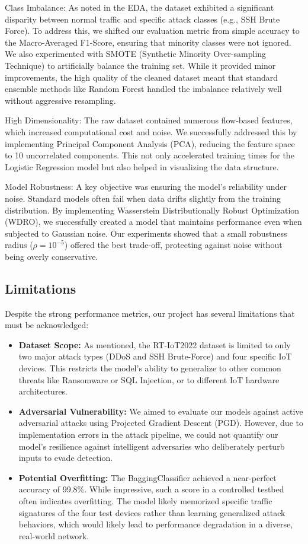 \documentclass[12pt, a4paper]{article}
\begin{document}
Class Imbalance: As noted in the EDA, the dataset exhibited a significant disparity between normal traffic and specific attack classes (e.g., SSH Brute Force). To address this, we shifted our evaluation metric from simple accuracy to the Macro-Averaged F1-Score, ensuring that minority classes were not ignored. We also experimented with SMOTE (Synthetic Minority Over-sampling Technique) to artificially balance the training set. While it provided minor improvements, the high quality of the cleaned dataset meant that standard ensemble methods like Random Forest handled the imbalance relatively well without aggressive resampling.

High Dimensionality: The raw dataset contained numerous flow-based features, which increased computational cost and noise. We successfully addressed this by implementing Principal Component Analysis (PCA), reducing the feature space to 10 uncorrelated components. This not only accelerated training times for the Logistic Regression model but also helped in visualizing the data structure.

Model Robustness: A key objective was ensuring the model's reliability under noise. Standard models often fail when data drifts slightly from the training distribution. By implementing Wasserstein Distributionally Robust Optimization (WDRO), we successfully created a model that maintains performance even when subjected to Gaussian noise. Our experiments showed that a small robustness radius ($\rho=10^{-5}$) offered the best trade-off, protecting against noise without being overly conservative.

\subsection{Limitations}
Despite the strong performance metrics, our project has several limitations that must be acknowledged:

\begin{itemize}
    \item \textbf{Dataset Scope:} As mentioned, the RT-IoT2022 dataset is limited to only two major attack types (DDoS and SSH Brute-Force) and four specific IoT devices. This restricts the model's ability to generalize to other common threats like Ransomware or SQL Injection, or to different IoT hardware architectures.
    \item \textbf{Adversarial Vulnerability:} We aimed to evaluate our models against active adversarial attacks using Projected Gradient Descent (PGD). However, due to implementation errors in the attack pipeline, we could not quantify our model's resilience against intelligent adversaries who deliberately perturb inputs to evade detection.
    \item \textbf{Potential Overfitting:} The BaggingClassifier achieved a near-perfect accuracy of 99.8\%. While impressive, such a score in a controlled testbed often indicates overfitting. The model likely memorized specific traffic signatures of the four test devices rather than learning generalized attack behaviors, which would likely lead to performance degradation in a diverse, real-world network.
\end{itemize}
\end{document}
